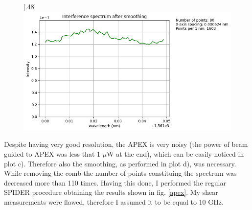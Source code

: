 \documentclass{article}
\begin{document}
\begin{figure}[H]
{}
\hfill
{}[.48\linewidth]{%
\includegraphics[width=\linewidth]{comb_4}%
}
\label{decombing}
\end{figure}

Despite having very good resolution, the APEX is very noisy (the power of beam guided to APEX was less that 1 $\mu$W at the end), which can be easily noticed in plot c). Therefore also the smoothing, as performed in plot d), was necessary. While removing the comb the number of points constituing the spectrum was decreased more than 110 times. Having this done, I performed the regular SPIDER procedure obtaining the results shown in fig. \ref{apex}. My shear measurements were flawed, therefore I assumed it to be equal to 10 GHz.
\end{document}
